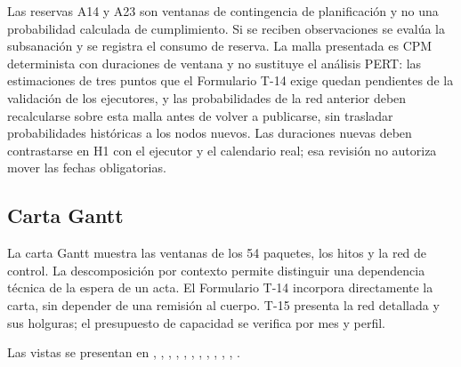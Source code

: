Las reservas A14 y A23 son ventanas de contingencia de planificación y no una probabilidad
calculada de cumplimiento. Si se reciben observaciones se evalúa la subsanación y se registra
el consumo de reserva. La malla presentada es CPM determinista con duraciones de ventana y no
sustituye el análisis PERT: las estimaciones de tres puntos que el Formulario T-14 exige quedan
pendientes de la validación de los ejecutores, y las probabilidades de la red anterior deben
recalcularse sobre esta malla antes de volver a publicarse, sin trasladar probabilidades
históricas a los nodos nuevos. Las duraciones nuevas deben contrastarse en H1 con el ejecutor
y el calendario real; esa revisión no autoriza mover las fechas obligatorias.

\subsection{Carta Gantt}\label{sec:7-gantt}

La carta Gantt muestra las ventanas de los 54 paquetes, los hitos y la red de control.
La descomposición por contexto permite distinguir una dependencia técnica de la espera de un
acta. El Formulario T-14 incorpora directamente la carta, sin depender de una remisión al cuerpo.
T-15 presenta la red detallada y sus holguras; el presupuesto de capacidad se verifica por mes y perfil.

Las vistas se presentan en , , , , , , , , , , , .

